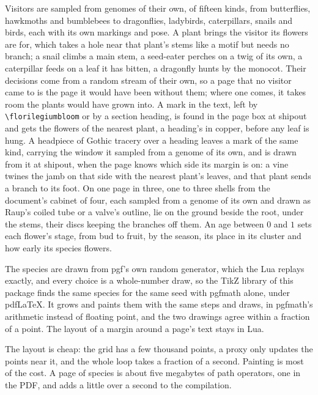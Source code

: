 \begin{remark}
Visitors are sampled from genomes of their own, of fifteen kinds, from butterflies, hawkmoths and
bumblebees to dragonflies, ladybirds, caterpillars, snails and birds, each with its own markings
and pose. A plant brings the visitor its flowers are for, which takes a hole near that plant's
stems like a motif but needs no branch; a snail climbs a main stem, a seed-eater perches on a
twig of its own, a caterpillar feeds on a leaf it has bitten, a dragonfly hunts by the monocot.
Their decisions come from a random stream of their own, so a page that no visitor came to is
the page it would have been without them; where one comes, it takes room the plants would have
grown into. A mark in the text, left by \verb|\florilegiumbloom| or by a section heading, is
found in the page box at shipout and gets the flowers of the nearest plant, a heading's in copper,
before any leaf is hung. A headpiece of Gothic tracery over a heading leaves a mark of the same
kind, carrying the window it sampled from a genome of its own, and is drawn from it at shipout,
when the page knows which side its margin is on: a vine twines the jamb on that side with the
nearest plant's leaves, and that plant sends a branch to its foot. On one page in three, one to
three shells from the document's cabinet of four, each sampled from a genome of its own and
drawn as Raup's coiled tube or a valve's outline, lie on the ground beside the root, under the
stems, their discs keeping the branches off them. An age between $0$ and $1$
sets each flower's stage, from bud to fruit, by the season, its place in its cluster and how
early its species flowers.
\end{remark}

\begin{remark}
The species are drawn from pgf's own random generator, which the Lua replays exactly, and
every choice is a whole-number draw, so the TikZ library of this package finds the same species
for the same seed with pgfmath alone, under pdf\LaTeX. It grows and paints them with the same
steps and draws, in pgfmath's arithmetic instead of floating point, and the two drawings agree
within a fraction of a point. The layout of a margin around a page's text stays in Lua.
\end{remark}

\begin{remark}[Cost]
The layout is cheap: the grid has a few thousand points, a proxy only updates the points
near it, and the whole loop takes a fraction of a second. Painting is most of the cost. A page
of species is about five megabytes of path operators, one in the PDF, and adds a little over a
second to the compilation.
\end{remark}
